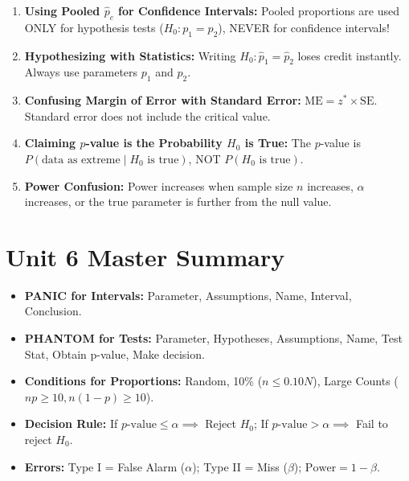 \begin{trapbox}
\begin{enumerate}[leftmargin=1.2em]
  \item \textbf{Using Pooled $\hat{p}_c$ for Confidence Intervals:} Pooled proportions are used ONLY for hypothesis tests ($H_0: p_1 = p_2$), NEVER for confidence intervals!
  \item \textbf{Hypothesizing with Statistics:} Writing $H_0: \hat{p}_1 = \hat{p}_2$ loses credit instantly. Always use parameters $p_1$ and $p_2$.
  \item \textbf{Confusing Margin of Error with Standard Error:} $\text{ME} = z^* \times \text{SE}$. Standard error does not include the critical value.
  \item \textbf{Claiming $p$-value is the Probability $H_0$ is True:} The $p$-value is $P(\text{data as extreme} \mid H_0 \text{ is true})$, NOT $P(H_0 \text{ is true})$.
  \item \textbf{Power Confusion:} Power increases when sample size $n$ increases, $\alpha$ increases, or the true parameter is further from the null value.
\end{enumerate}
\end{trapbox}
\section{Unit 6 Master Summary}
\begin{lessonbox}
\begin{itemize}[leftmargin=1.2em]
  \item \textbf{PANIC for Intervals:} Parameter, Assumptions, Name, Interval, Conclusion.
  \item \textbf{PHANTOM for Tests:} Parameter, Hypotheses, Assumptions, Name, Test Stat, Obtain p-value, Make decision.
  \item \textbf{Conditions for Proportions:} Random, 10\% ($n \le 0.10N$), Large Counts ($np \ge 10, n(1-p) \ge 10$).
  \item \textbf{Decision Rule:} If $p\text{-value} \le \alpha \implies$ Reject $H_0$; If $p\text{-value} > \alpha \implies$ Fail to reject $H_0$.
  \item \textbf{Errors:} Type I = False Alarm ($\alpha$); Type II = Miss ($\beta$); $\text{Power} = 1 - \beta$.
\end{itemize}
\end{lessonbox}
\clearpage
